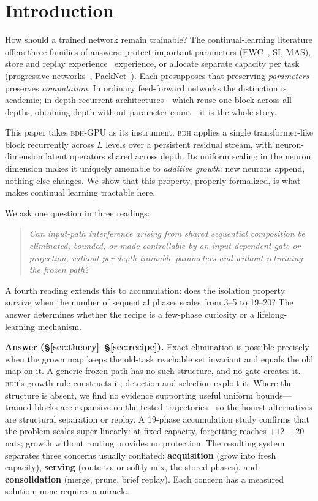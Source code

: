 \documentclass[11pt]{article}
\theoremstyle{definition}\newtheorem{definition}{Definition}
\theoremstyle{remark}\newtheorem{remark}{Remark}
\newcommand{\BDH}{\textsc{bdh}}
\begin{document}
\section{Introduction}
\label{sec:intro}

How should a trained network remain trainable? The continual-learning literature offers
three families of answers: protect important parameters (EWC~\cite{ewc}, SI, MAS), store and replay experience~\cite{agem}
experience, or allocate separate capacity per task (progressive networks~\cite{pgn}, PackNet~\cite{packnet}). Each
presupposes that preserving \emph{parameters} preserves \emph{computation}. In ordinary
feed-forward networks the distinction is academic; in depth-recurrent architectures---which
reuse one block across all depths, obtaining depth without parameter count---it is the whole
story.

This paper takes \BDH{}-GPU as its instrument. \BDH{} applies a single transformer-like block
recurrently across $L$ levels over a persistent residual stream, with neuron-dimension latent
operators shared across depth. Its uniform scaling in the neuron dimension makes it uniquely
amenable to \emph{additive growth}: new neurons append, nothing else changes. We show that
this property, properly formalized, is what makes continual learning tractable here.

We ask one question in three readings:
\begin{quote}\itshape
Can input-path interference arising from shared sequential composition be eliminated,
bounded, or made controllable by an input-dependent gate or projection, without per-depth
trainable parameters and without retraining the frozen path?
\end{quote}

\noindent A fourth reading extends this to accumulation: does the isolation property
survive when the number of sequential phases scales from 3--5 to 19--20? The answer
determines whether the recipe is a few-phase curiosity or a lifelong-learning mechanism.

\noindent\textbf{Answer (\S\ref{sec:theory}--\S\ref{sec:recipe}).} Exact elimination is
possible precisely when the grown map keeps the old-task reachable set invariant and equals
the old map on it. A generic frozen path has no such structure, and no gate creates it.
\BDH{}'s growth rule constructs it; detection and selection exploit it. Where the structure
is absent, we find no evidence supporting useful uniform bounds---trained blocks are
expansive on the tested trajectories---so the honest alternatives are structural separation
or replay. A 19-phase accumulation study confirms that the problem scales super-linearly:
at fixed capacity, forgetting reaches $+12$--$+20$ nats; growth without routing provides no
protection. The resulting system separates three concerns usually conflated:
\textbf{acquisition} (grow into fresh capacity), \textbf{serving} (route to, or softly mix,
the stored phases), and \textbf{consolidation} (merge, prune, brief replay). Each concern
has a measured solution; none requires a miracle.
\end{document}
